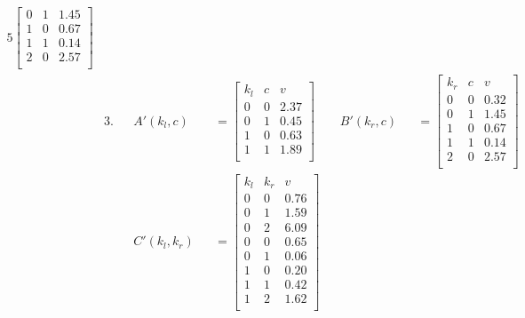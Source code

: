 \begin{alignat*}{5}
\begin{bmatrix}
                        0   & 1 & 1.45 \\
                        1   & 0 & 0.67 \\
                        1   & 1 & 0.14 \\
                        2   & 0 & 2.57 \\
                    \end{bmatrix}
    \\
    &3. &&A'(k_l, c) &&= \begin{bmatrix}
                                k_l & c & v    \\
                                0   & 0 & 2.37 \\
                                0   & 1 & 0.45 \\
                                1   & 0 & 0.63 \\
                                1   & 1 & 1.89 \\
                            \end{bmatrix}
    &&B'(k_r, c) &&= \begin{bmatrix}
                        k_r & c & v    \\
                        0   & 0 & 0.32 \\
                        0   & 1 & 1.45 \\
                        1   & 0 & 0.67 \\
                        1   & 1 & 0.14 \\
                        2   & 0 & 2.57 \\
                    \end{bmatrix}
    \\
    & &&C'(k_l, k_r) &&= \begin{bmatrix}
                            k_l & k_r & v    \\
                            0   & 0   & 0.76 \\
                            0   & 1   & 1.59 \\
                            0   & 2   & 6.09 \\
                            0   & 0   & 0.65 \\
                            0   & 1   & 0.06 \\
                            1   & 0   & 0.20 \\
                            1   & 1   & 0.42 \\
                            1   & 2   & 1.62 \\

\end{bmatrix}
\end{alignat*}
